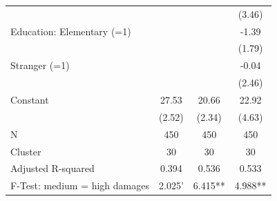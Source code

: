{\begin{tabular}{l*{3}{c}}
                    &                     &                     &      (3.46)         \\
Education: Elementary (=1)&                     &                     &       -1.39         \\
                    &                     &                     &      (1.79)         \\
Stranger (=1)       &                     &                     &       -0.04         \\
                    &                     &                     &      (2.46)         \\
Constant            &       27.53\sym{***}&       20.66\sym{***}&       22.92\sym{***}\\
                    &      (2.52)         &      (2.34)         &      (4.63)         \\
\midrule
N                   &         450         &         450         &         450         \\
Cluster             &          30         &          30         &          30         \\
Adjusted R-squared  &       0.394         &       0.536         &       0.533         \\
F-Test: medium = high damages&      2.025'         &     6.415**         &     4.988**         \\
\bottomrule
\end{tabular}
}
